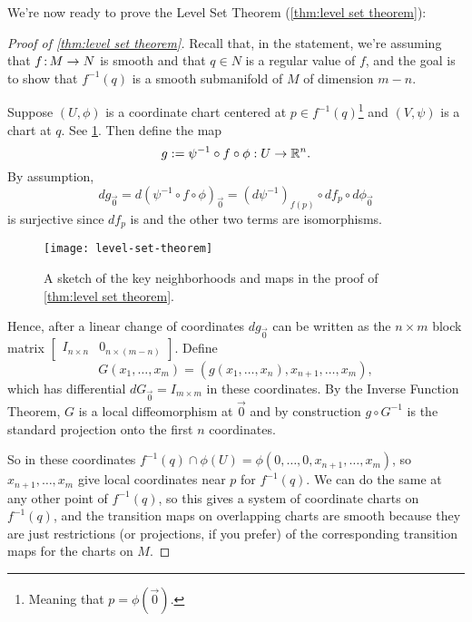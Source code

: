 We're now ready to prove the Level Set Theorem (\cref{thm:level set theorem}):

\begin{proof}[Proof of \cref{thm:level set theorem}]
	Recall that, in the statement, we're assuming that $f\colon\thinspace\!\! M \to N$ is smooth and that $q \in N$ is a regular value of $f$, and the goal is to show that $f^{-1}(q)$ is a smooth submanifold of $M$ of dimension $m-n$.
	
	Suppose $(U,\phi)$ is a coordinate chart centered at $p \in f^{-1}(q)$\footnote{Meaning that $p = \phi(\vec{0})$.} and $(V, \psi)$ is a chart at $q$. See \cref{fig:level set theorem}. Then define the map
	\[
		g := \psi^{-1} \circ f \circ \phi: U \to \mathbb{R}^n.
	\]
	By assumption,
	\[
		dg_{\vec{0}} = d(\psi^{-1} \circ f \circ \phi)_{\vec{0}} = (d \psi^{-1})_{f(p)} \circ df_p \circ d\phi_{\vec{0}}
	\]
	is surjective since $df_p$ is and the other two terms are isomorphisms.
	
	\begin{figure}[htbp]
		\centering
			\texttt{[image: level-set-theorem]}
		\caption{A sketch of the key neighborhoods and maps in the proof of \cref{thm:level set theorem}.}
		\label{fig:level set theorem}
	\end{figure}
	
	Hence, after a linear change of coordinates $dg_{\vec{0}}$ can be written as the $n \times m$ block matrix $\begin{bmatrix} I_{n \times n} & 0_{n \times (m-n)} \end{bmatrix}$. Define
	\[
		G(x_1, \dots , x_m) = (g(x_1, \dots , x_n), x_{n+1}, \dots , x_m),
	\]
	which has differential $dG_{\vec{0}} = I_{m \times m}$ in these coordinates. By the Inverse Function Theorem, $G$ is a local diffeomorphism at $\vec{0}$ and by construction $g \circ G^{-1}$ is the standard projection onto the first $n$ coordinates.
	
	So in these coordinates $f^{-1}(q) \cap \phi(U) = \phi(0, \dots , 0, x_{n+1}, \dots , x_m)$, so $x_{n+1} , \dots , x_m$ give local coordinates near $p$ for $f^{-1}(q)$. We can do the same at any other point of $f^{-1}(q)$, so this gives a system of coordinate charts on $f^{-1}(q)$, and the transition maps on overlapping charts are smooth because they are just restrictions (or projections, if you prefer) of the corresponding transition maps for the charts on $M$.
\end{proof}